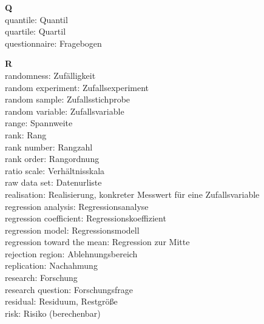 \medskip
\noindent
{\bf Q}\\
quantile: Quantil\\
quartile: Quartil\\
questionnaire: Fragebogen

\medskip
\noindent
{\bf R}\\
randomness: Zuf\"{a}lligkeit\\
random experiment: Zufallsexperiment\\
random sample: Zufallsstichprobe\\
random variable: Zufallsvariable\\
range: Spannweite\\
rank: Rang\\
rank number: Rangzahl\\
rank order: Rangordnung\\
ratio scale: Verh\"{a}ltnisskala\\
raw data set: Datenurliste\\
realisation: Realisierung, konkreter Messwert f\"{u}r eine 
Zufallsvariable\\
regression analysis: Regressionsanalyse\\
regression coefficient: Regressionskoeffizient\\
regression model: Regressionsmodell\\
regression toward the mean: Regression zur Mitte\\
rejection region: Ablehnungsbereich\\
replication: Nachahmung\\
research: Forschung\\
research question: Forschungsfrage\\
residual: Residuum, Restgr\"{o}\ss e\\
risk: Risiko (berechenbar)

